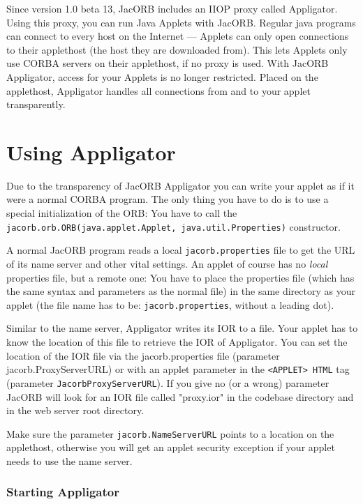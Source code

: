 \documentclass[12pt]{scrbook}
\begin{document}
\bigskip
Since  version 1.0  beta  13,  JacORB includes  an  IIOP proxy  called
Appligator.  Using this proxy, you  can run Java Applets with JacORB.
Regular  java programs can  connect to  every host  on the  Internet ---
Applets can only  open connections to their applethost  (the host they
are downloaded  from).  This  lets Applets only  use CORBA  servers on
their applethost, if no proxy is used.  With JacORB Appligator, access
for your Applets  is no longer restricted.  Placed  on the applethost,
Appligator   handles  all   connections  from   and  to   your  applet
transparently.


\section{Using Appligator}

Due to the transparency of JacORB Appligator you can write your applet
as if it were  a normal CORBA program.  The only thing  you have to do
is to  use a special initialization of  the ORB: You have  to call the
{\tt     jacorb.orb.ORB(java.applet.Applet,     java.util.Properties)}
constructor.

A normal JacORB program reads  a local {\tt jacorb.properties} file to
get the URL of its name  server and other vital settings. An applet of
course has no {\em local} properties  file, but a remote one: You have
to place the properties file (which has the same syntax and parameters
as the  normal file) in  the same directory  as your applet  (the file
name has to be: {\tt jacorb.properties}, without a leading dot).

Similar to the name server, Appligator writes its IOR to a file.  Your
applet has  to know the location of  this file to retrieve  the IOR of
Appligator.   You  can  set the  location  of  the  IOR file  via  the
jacorb.properties  file (parameter  jacorb.ProxyServerURL) or  with an
applet    parameter   in    the   {\tt <APPLET>    HTML}    tag   (parameter
{\tt JacorbProxyServerURL}).  If  you give no (or a  wrong) parameter JacORB
will look for an IOR file called "proxy.ior" in the codebase directory
and in the web server root directory.

Make  sure  the  parameter  {\tt  jacorb.NameServerURL}  points  to  a
location on the applethost, otherwise  you will get an applet security
exception if your applet needs to use the name server.

\subsubsection*{Starting Appligator}
\end{document}
